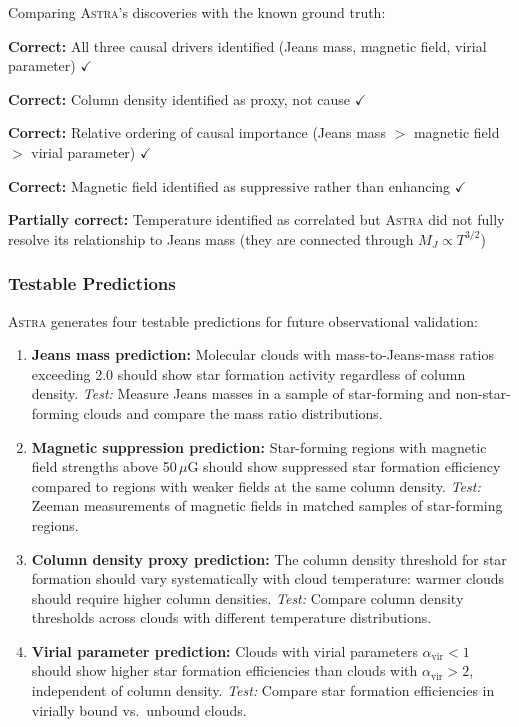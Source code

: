 \documentclass[usenatbib]{rasti}
\newcommand{\astra}{\textsc{Astra}\xspace}
\begin{document}
Comparing \astra's discoveries with the known ground truth:
\begin{description}
  \item \textbf{Correct:} All three causal drivers identified (Jeans mass, magnetic field, virial parameter) $\checkmark$
  \item \textbf{Correct:} Column density identified as proxy, not cause $\checkmark$
  \item \textbf{Correct:} Relative ordering of causal importance (Jeans mass $>$ magnetic field $>$ virial parameter) $\checkmark$
  \item \textbf{Correct:} Magnetic field identified as suppressive rather than enhancing $\checkmark$
  \item \textbf{Partially correct:} Temperature identified as correlated but \astra did not fully resolve its relationship to Jeans mass (they are connected through $M_J \propto T^{3/2}$)
\end{description}

\subsubsection{Testable Predictions}
\label{sec:tc6:phase6}

\astra generates four testable predictions for future observational validation:
\begin{enumerate}
  \item[(P1)] \textbf{Jeans mass prediction:} Molecular clouds with mass-to-Jeans-mass ratios exceeding 2.0 should show star formation activity regardless of column density. \emph{Test:} Measure Jeans masses in a sample of star-forming and non-star-forming clouds and compare the mass ratio distributions.

  \item[(P2)] \textbf{Magnetic suppression prediction:} Star-forming regions with magnetic field strengths above 50\,$\mu$G should show suppressed star formation efficiency compared to regions with weaker fields at the same column density. \emph{Test:} Zeeman measurements of magnetic fields in matched samples of star-forming regions.

  \item[(P3)] \textbf{Column density proxy prediction:} The column density threshold for star formation should vary systematically with cloud temperature: warmer clouds should require higher column densities. \emph{Test:} Compare column density thresholds across clouds with different temperature distributions.

  \item[(P4)] \textbf{Virial parameter prediction:} Clouds with virial parameters $\alpha_\mathrm{vir} < 1$ should show higher star formation efficiencies than clouds with $\alpha_\mathrm{vir} > 2$, independent of column density. \emph{Test:} Compare star formation efficiencies in virially bound vs.\ unbound clouds.
\end{enumerate}
\end{document}
